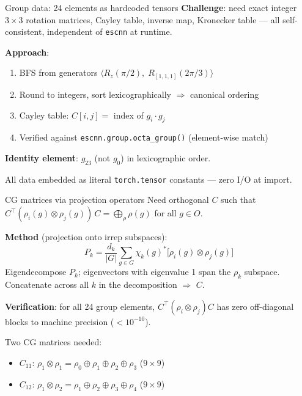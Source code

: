 \documentclass[aspectratio=169]{beamer}
\begin{document}
\begin{frame}{Group data: 24 elements as hardcoded tensors}
  \textbf{Challenge}: need exact integer $3\times 3$ rotation matrices, Cayley table, inverse map, Kronecker table --- all self-consistent, independent of \texttt{escnn} at runtime.

  \bigskip

  \textbf{Approach}:
  \begin{enumerate}
    \item BFS from generators $\langle R_z(\pi/2),\; R_{[1,1,1]}(2\pi/3) \rangle$
    \item Round to integers, sort lexicographically $\Rightarrow$ canonical ordering
    \item Cayley table: $C[i,j] = $ index of $g_i \cdot g_j$
    \item Verified against \texttt{escnn.group.octa\_group()} (element-wise match)
  \end{enumerate}

  \bigskip

  \textbf{Identity element}: $g_{23}$ (not $g_0$) in lexicographic order.

  \smallskip

  All data embedded as literal \texttt{torch.tensor} constants --- zero I/O at import.
\end{frame}

\begin{frame}{CG matrices via projection operators}
  Need orthogonal $C$ such that $C^\top (\rho_i(g) \otimes \rho_j(g))\, C = \bigoplus_\rho \rho(g)$ for all $g \in O$.

  \bigskip

  \textbf{Method} (projection onto irrep subspaces):
  \[
    P_k = \frac{d_k}{|G|} \sum_{g \in G} \chi_k(g)^* \bigl[\rho_i(g) \otimes \rho_j(g)\bigr]
  \]
  Eigendecompose $P_k$; eigenvectors with eigenvalue 1 span the $\rho_k$ subspace.
  Concatenate across all $k$ in the decomposition $\Rightarrow$ $C$.

  \bigskip

  \textbf{Verification}: for all 24 group elements, $C^\top (\rho_i \otimes \rho_j) C$
  has zero off-diagonal blocks to machine precision ($< 10^{-10}$).

  \bigskip

  Two CG matrices needed:
  \begin{itemize}
    \item $C_{11}$: $\rho_1 \otimes \rho_1 = \rho_0 \oplus \rho_1 \oplus \rho_2 \oplus \rho_3$ \quad ($9\times 9$)
    \item $C_{12}$: $\rho_1 \otimes \rho_2 = \rho_1 \oplus \rho_2 \oplus \rho_3 \oplus \rho_4$ \quad ($9\times 9$)
  \end{itemize}
\end{frame}
\end{document}
